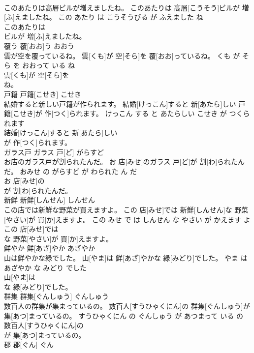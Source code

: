 \documentclass[8pt]{extreport}
\begin{document}
\begin{CJK}{UTF8}{min}
\\	このあたりは高層ビルが増えましたね。	このあたりは 高層[こうそう]ビルが 増[ふ]えましたね。	この あたり は こうそうびる が ふえました ね	
\\	このあたりは
\\	ビルが 増[ふ]えましたね。			
\\	覆う	覆[おお]う	おおう	
\\	雲が空を覆っているね。	雲[くも]が 空[そら]を 覆[おお]っているね。	くも が そら を おおって いる ね	
\\	雲[くも]が 空[そら]を
\\	ね。			
\\	戸籍	戸籍[こせき]	こせき	
\\	結婚すると新しい戸籍が作られます。	結婚[けっこん]すると 新[あたら]しい 戸籍[こせき]が 作[つく]られます。	けっこん する と あたらしい こせき が つくられます	
\\	結婚[けっこん]すると 新[あたら]しい
\\	が 作[つく]られます。			
\\	ガラス戸	ガラス 戸[ど]	がらすど	
\\	お店のガラス戸が割られたんだ。	お 店[みせ]のガラス 戸[ど]が 割[わ]られたんだ。	おみせ の がらすど が わられた ん だ	
\\	お 店[みせ]の
\\	が 割[わ]られたんだ。			
\\	新鮮	新鮮[しんせん]	しんせん	
\\	この店では新鮮な野菜が買えますよ。	この 店[みせ]では 新鮮[しんせん]な 野菜[やさい]が 買[か]えますよ。	この みせ で は しんせん な やさい が かえます よ	
\\	この 店[みせ]では
\\	な 野菜[やさい]が 買[か]えますよ。			
\\	鮮やか	鮮[あざ]やか	あざやか	
\\	山は鮮やかな緑でした。	山[やま]は 鮮[あざ]やかな 緑[みどり]でした。	やま は あざやか な みどり でした	
\\	山[やま]は
\\	な 緑[みどり]でした。			
\\	群集	群集[ぐんしゅう]	ぐんしゅう	
\\	数百人の群集が集まっているの。	数百人[すうひゃくにん]の 群集[ぐんしゅう]が 集[あつ]まっているの。	すうひゃくにん の ぐんしゅう が あつまって いる の	
\\	数百人[すうひゃくにん]の
\\	が 集[あつ]まっているの。			
\\	郡	郡[ぐん]	ぐん	

\end{CJK}
\end{document}
